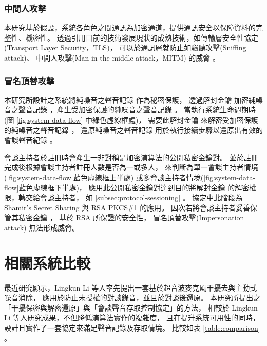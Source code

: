 \subsubsection{中間人攻擊}

    本研究基於假設，系統各角色之間通訊為加密通道，提供通訊安全以保障資料的完整性、機密性。
透過引用目前的技術發展現狀的成熟技術，如傳輸層安全性協定(Transport Layer Security，TLS)，
可以於通訊層就防止如竊聽攻擊(Sniffing attack)、
中間人攻擊(Man-in-the-middle attack，MITM) 的威脅 \cite{rfc5246}\cite{rfc8446}。


\subsubsection{冒名頂替攻擊}

    本研究所設計之系統將純噪音之聲音記錄 \DEFrecN 作為秘密保護，
透過解封金鑰 \DEFunsealKey 加密純噪音之聲音記錄 \DEFrecN，產生受加密保護的純噪音之聲音記錄 \DEFrecP。
當執行系統生命週期時(圖 \ref{fig:system-data-flow} 中綠色虛線框處)，
需要此解封金鑰 \DEFunsealKey 來解密受加密保護的純噪音之聲音記錄 \DEFrecP，
還原純噪音之聲音記錄 \DEFrecN 用於執行接續步驟以還原出有效的會談聲音紀錄 \DEFrecREV。

    會談主持者於註冊時會產生一非對稱是加密演算法的公開私密金鑰對。
並於註冊完成後根據會談主持者註冊人數是否為一或多人，
來判斷為單一會談主持者情境(\ref{fig:system-data-flow}藍色虛線框上半處)
或多會談主持者情境(\ref{fig:system-data-flow}藍色虛線框下半處)，
應用此公開私密金鑰對達到目的將解封金鑰 \DEFunsealKey 的解密權限，轉交給會談主持者，
如 \ref{subsec:protocol-sessioning} 。
協定中此階段為 Shamir's Secret Sharing \cite{shamir1979share}
與 RSA PKCS\#1 \cite{rfc8017} 的應用。
因次若將會談主持者妥善保管其私密金鑰 \DEFprivateKey，
基於 RSA \cite{rfc8017} 所保證的安全性，
冒名頂替攻擊(Impersonation attack) 無法形成威脅。


\section{相關系統比較}\label{sec:comparison}

    最近研究顯示，Lingkun Li 等人率先提出一套基於超音波麥克風干擾去與主動式噪音消除，
應用於防止未授權的對談錄音，並且於對談後還原\cite{li2020patronus}。
本研究所提出之「干擾保密與解密還原」與「會談聲音存取控制協定」的方法，
相較於 Lingkun Li 等人研究成果，不但降低演算法實作的複雜度，
且在提升系統可用性的同時，設計且實作了一套協定來滿足聲音記錄及存取情境。
比較如表 \ref{table:comparison} 。

